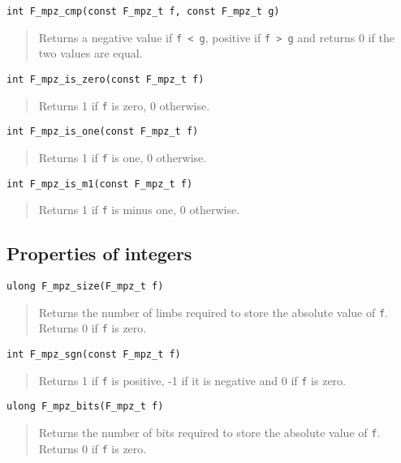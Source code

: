 \documentclass[a4paper,10pt]{article}
\newcommand{\code}{\lstinline}
\begin{document}
\begin{lstlisting}
int F_mpz_cmp(const F_mpz_t f, const F_mpz_t g)
\end{lstlisting}
\begin{quote}
Returns a negative value if \code{f < g}, positive if \code{f > g} and returns 0 if the two values are equal.
\end{quote}

\begin{lstlisting}
int F_mpz_is_zero(const F_mpz_t f)
\end{lstlisting}
\begin{quote}
Returns 1 if \code{f} is zero, 0 otherwise.
\end{quote}

\begin{lstlisting}
int F_mpz_is_one(const F_mpz_t f)
\end{lstlisting}
\begin{quote}
Returns 1 if \code{f} is one, 0 otherwise.
\end{quote}

\begin{lstlisting}
int F_mpz_is_m1(const F_mpz_t f)
\end{lstlisting}
\begin{quote}
Returns 1 if \code{f} is minus one, 0 otherwise.
\end{quote}

\subsection{Properties of integers}

\begin{lstlisting}
ulong F_mpz_size(F_mpz_t f)
\end{lstlisting}
\begin{quote}
Returns the number of limbs required to store the absolute value of \code{f}. Returns 0 if \code{f} is zero.
\end{quote}

\begin{lstlisting}
int F_mpz_sgn(const F_mpz_t f)
\end{lstlisting}
\begin{quote}
Returns 1 if \code{f} is positive, -1 if it is negative and 0 if \code{f} is zero.
\end{quote}

\begin{lstlisting}
ulong F_mpz_bits(F_mpz_t f)
\end{lstlisting}
\begin{quote}
Returns the number of bits required to store the absolute value of \code{f}. Returns 0 if \code{f} is zero.
\end{quote}
\end{document}
